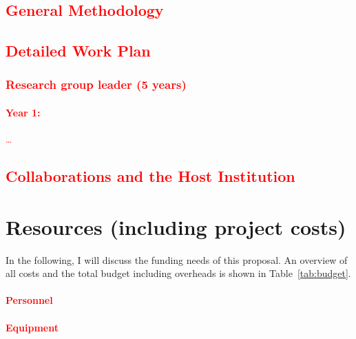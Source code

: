 \documentclass[B2]{ercgrant}
\begin{document}
\subsection*{\textcolor{red}{General Methodology}}

\textcolor{red}{\blindtext[2]}

\subsection*{\textcolor{red}{Detailed Work Plan}}

\subsubsection{\textcolor{red}{Research group leader (5 years)}}

\paragraph*{\textcolor{red}{Year 1:}} \textcolor{red}{\blindtext[5]}

\textcolor{red}{\ldots}

\subsection*{\textcolor{red}{Collaborations and the Host Institution}}

\textcolor{red}{\blindtext[2]}



\section{Resources (including project costs)}\label{sec:budget}
In the following, I will discuss the funding needs of this proposal. An overview of all costs and
the total budget including overheads is shown in Table~\ref{tab:budget}.

\paragraph{\textcolor{red}{Personnel}}

\textcolor{red}{\blindtext[1]}

\paragraph{\textcolor{red}{Equipment}}
\end{document}
